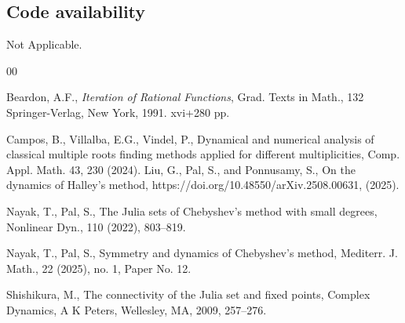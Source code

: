 \documentclass[12pt]{article}
\begin{document}
 \subsection{Code availability} Not Applicable.
\begin{thebibliography}{00}

	 Beardon, A.F., \textit{Iteration of Rational Functions}, Grad. Texts in Math., 132
	Springer-Verlag, New York, 1991. xvi+280 pp. 
	
    
      Campos, B., Villalba, E.G., Vindel, P., Dynamical and numerical analysis of classical multiple roots finding methods applied for different multiplicities, Comp. Appl. Math. 43, 230 (2024).
  	  Liu, G.,   Pal, S., and  Ponnusamy, S., On the dynamics of Halley's method,  
  https://doi.org/10.48550/arXiv.2508.00631,  (2025).  
    
%		
%	
	
	Nayak, T., Pal, S., The Julia sets of Chebyshev's method with small degrees, Nonlinear Dyn., 110 (2022), 803--819.
	
	 Nayak, T., Pal, S., Symmetry and dynamics of Chebyshev's method, Mediterr. J. Math.,  22 (2025), no. 1, Paper No. 12.
    
		
 	 Shishikura, M., The connectivity of the Julia set and fixed points, Complex Dynamics, A K Peters, Wellesley, MA, 2009, 257--276.
 

\end{thebibliography}
\end{document}
